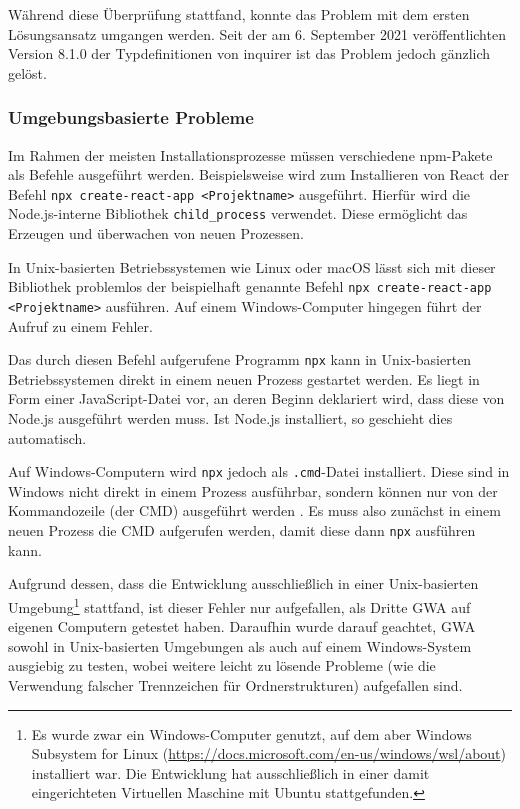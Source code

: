 Während diese Überprüfung stattfand, konnte das Problem mit dem ersten Lösungsansatz umgangen werden. Seit der am 6. September 2021 veröffentlichten Version 8.1.0 der Typdefinitionen von inquirer ist das Problem jedoch gänzlich gelöst.

\subsubsection{Umgebungsbasierte Probleme}
Im Rahmen der meisten Installationsprozesse müssen verschiedene \gls{npm}-Pakete als Befehle ausgeführt werden. Beispielsweise wird zum Installieren von React der Befehl \verb/npx create-react-app <Projektname>/ ausgeführt. Hierfür wird die Node.js-interne Bibliothek \verb/child_process/ verwendet. Diese ermöglicht das Erzeugen und überwachen von neuen Prozessen.

In Unix-basierten Betriebssystemen wie Linux oder macOS lässt sich mit dieser Bibliothek problemlos der beispielhaft genannte Befehl \verb/npx create-react-app <Projektname>/ ausführen. Auf einem Windows-Computer hingegen führt der Aufruf zu einem Fehler.

Das durch diesen Befehl aufgerufene Programm \verb/npx/ kann in Unix-basierten Betriebssystemen direkt in einem neuen Prozess gestartet werden. Es liegt in Form einer JavaScript-Datei vor, an deren Beginn deklariert wird, dass diese von Node.js ausgeführt werden muss. Ist Node.js installiert, so geschieht dies automatisch.

Auf Windows-Computern wird \verb/npx/ jedoch als \verb/.cmd/-Datei installiert. Diese sind in Windows nicht direkt in einem Prozess ausführbar, sondern können nur von der Kommandozeile (der CMD) ausgeführt werden \cite{windows_spawn_cmd}. Es muss also zunächst in einem neuen Prozess die CMD aufgerufen werden, damit diese dann \verb/npx/ ausführen kann.

Aufgrund dessen, dass die Entwicklung ausschließlich in einer Unix-basierten Umgebung\footnote{Es wurde zwar ein Windows-Computer genutzt, auf dem aber Windows Subsystem for Linux (\url{https://docs.microsoft.com/en-us/windows/wsl/about}) installiert war. Die Entwicklung hat ausschließlich in einer damit eingerichteten Virtuellen Maschine mit Ubuntu stattgefunden.} stattfand, ist dieser Fehler nur aufgefallen, als Dritte \gls{GWA} auf eigenen Computern getestet haben. Daraufhin wurde darauf geachtet, \gls{GWA} sowohl in Unix-basierten Umgebungen als auch auf einem Windows-System ausgiebig zu testen, wobei weitere leicht zu lösende Probleme (wie die Verwendung falscher Trennzeichen für Ordnerstrukturen) aufgefallen sind.

